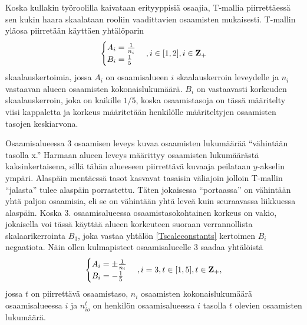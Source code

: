 \documentclass[a4paper,finnish,12pt]{article}
\begin{document}
Koska kullakin työroolilla kaivataan erityyppisiä osaajia, T-mallia piirrettäessä sen kukin haara skaalataan rooliin vaadittavien osaamisten mukaisesti. T-mallin yläosa piirretään käyttäen yhtälöparin
\begin{equation}
\begin{cases}
A_i = \frac{1}{n_i} \\
B_i = \frac{1}{5} \\
\end{cases} \\ , i \in [1,2], i \in \mathbf{Z}_{+}
\label{Tscaleconstants}
\end{equation} skaalauskertoimia, jossa $A_i$ on osaamisalueen $i$ skaalauskerroin leveydelle ja $n_i$ vastaavan alueen osaamisten kokonaislukumäärä. $B_i$ on vastaavasti korkeuden skaalauskerroin, joka on kaikille $1/5$, koska osaamistasoja on tässä määritelty viisi kappaletta ja korkeus määritetään henkilölle määriteltyjen osaamisten tasojen keskiarvona.

Osaamisalueessa 3 osaamisen leveys kuvaa osaamisten lukumäärää ``vähintään tasolla x.'' Harmaan alueen leveys määrittyy osaamisten lukumäärästä kaksinkertaisena, sillä tähän alueeseen piirrettävä kuvaaja peilataan $y$-akselin ympäri. Alaspäin mentäessä tasot kasvavat tasaisin väliajoin jolloin T-mallin ``jalasta'' tulee alaspäin porrastettu. Täten jokaisessa ``portaassa'' on vähintään yhtä paljon osaamisia, eli se on vähintään yhtä leveä kuin seuraavassa liikkuessa alaspäin. Koska 3. osaamisalueessa osaamistasokohtainen korkeus on vakio, jokaisella voi tässä käyttää alueen korkeuteen suoraan verrannollista skalaarikerrointa $B_3$, joka vastaa yhtälön \eqref{Tscaleconstants} kertoimen $B_i$ negaatiota. Näin ollen kulmapisteet osaamisalueelle 3 saadaa yhtälöistä
\begin{equation}
\begin{cases}
A_i = \pm \frac{1}{n_i} \\
B_i = - \frac{1}{5} \\
\end{cases} \\ , i = 3, t \in [1,5], t \in \mathbf{Z}_{+},
\label{Tscaleconstants3}
\end{equation} jossa $t$ on piirrettävä osaamistaso, $n_i$ osaamisten kokonaislukumäärä osaamisalueessa $i$ ja $n_{io}^t$ on henkilön osaamisalueessa $i$ tasolla $t$ olevien osaamisten lukumäärä.
\end{document}
